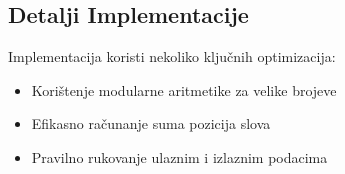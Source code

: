 \subsection{Detalji Implementacije}
Implementacija koristi nekoliko ključnih optimizacija:
\begin{itemize}
    \item Korištenje modularne aritmetike za velike brojeve
    \item Efikasno računanje suma pozicija slova
    \item Pravilno rukovanje ulaznim i izlaznim podacima
\end{itemize}
 
